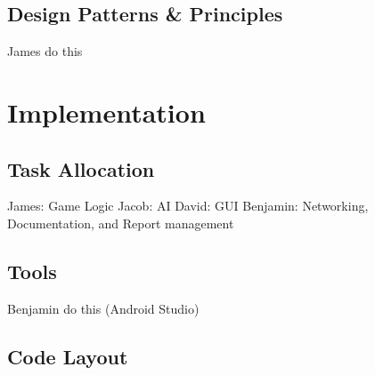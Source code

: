 \documentclass{article}
\begin{document}
\subsection{Design Patterns \& Principles}
James do this

\section{Implementation}

\subsection{Task Allocation}
James: Game Logic\newline
Jacob: AI\newline
David: GUI\newline
Benjamin: Networking, Documentation, and Report management

\subsection{Tools}
Benjamin do this (Android Studio)

\subsection{Code Layout}
\end{document}
